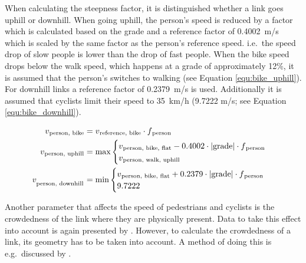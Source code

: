 When calculating the steepness factor, it is distinguished whether a link goes uphill or downhill. When going uphill, the person's speed is reduced by a factor which is calculated based on the grade and a reference factor of 0.4002~m/s which is scaled by the same factor as the person's reference speed. i.e.\ the speed drop of slow people is lower than the drop of fast people. When the bike speed drops below the walk speed, which happens at a grade of approximately 12\%, it is assumed that the person's switches to walking (see Equation \ref{equ:bike_uphill}). For downhill links a reference factor of 0.2379~m/s is used. Additionally it is assumed that cyclists limit their speed to 35~km/h (9.7222 m/s; see Equation \ref{equ:bike_downhill}).

{\fontsize{12.8pt}{12}
\begin{align}
    v\textsubscript{person, bike} &= v\textsubscript{reference, bike} \cdot f\textsubscript{person}\\
    v\textsubscript{person, uphill} &= \text{max}
    \begin{cases}
        v\textsubscript{person, bike, flat} - 0.4002 \cdot |\text{grade}| \cdot f\textsubscript{person}\\
        v\textsubscript{person, walk, uphill}
    \end{cases}\label{equ:bike_uphill}\\
    v_{\textsubscript{person, downhill}} &= \text{min}
    \begin{cases}
        v\textsubscript{person, bike, flat} + 0.2379 \cdot |\text{grade}| \cdot f\textsubscript{person}\\
        9.7222
    \end{cases}\label{equ:bike_downhill}
\end{align}
}%

Another parameter that affects the speed of pedestrians and cyclists is the crowdedness of the link where they are physically present. Data to take this effect into account is again presented by \citet{Weidmann_TechRep_IVT_1992}. However, to calculate the crowdedness of a link, its geometry has to be taken into account. A method of doing this is e.g.~discussed by \citet{Laemmel_PhDThesis_2011}. 

